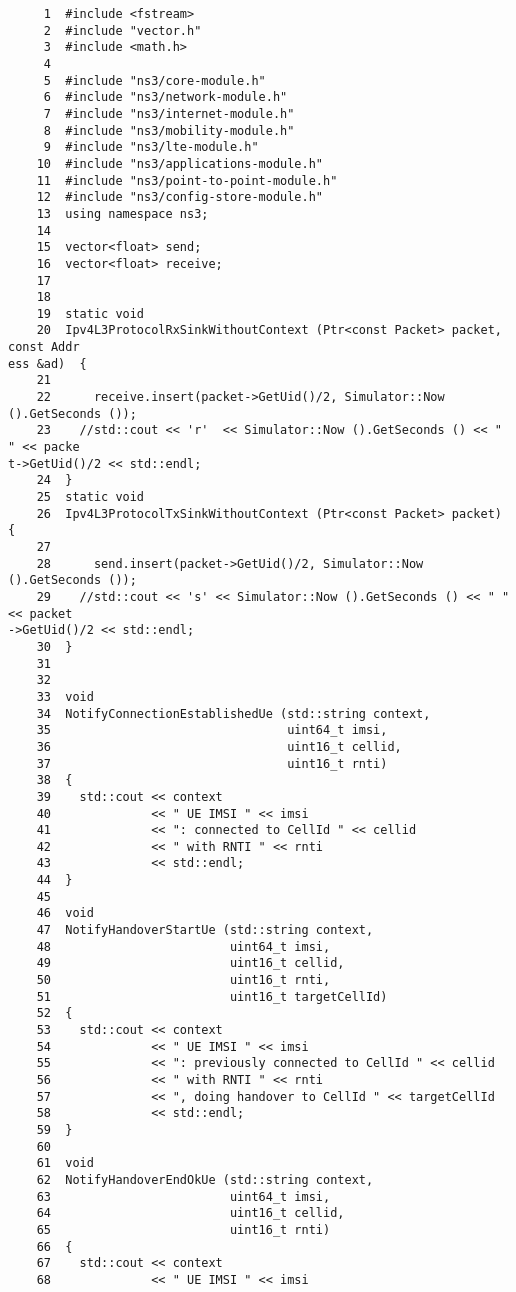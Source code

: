 \fontsize{10pt}{10pt}\selectfont
\begin{verbatim}
     1  #include <fstream>
     2  #include "vector.h"
     3  #include <math.h>
     4
     5  #include "ns3/core-module.h"
     6  #include "ns3/network-module.h"
     7  #include "ns3/internet-module.h"
     8  #include "ns3/mobility-module.h"
     9  #include "ns3/lte-module.h"
    10  #include "ns3/applications-module.h"
    11  #include "ns3/point-to-point-module.h"
    12  #include "ns3/config-store-module.h"
    13  using namespace ns3;
    14
    15  vector<float> send;
    16  vector<float> receive;
    17
    18
    19  static void
    20  Ipv4L3ProtocolRxSinkWithoutContext (Ptr<const Packet> packet, const Addr
ess &ad)  {
    21    
    22      receive.insert(packet->GetUid()/2, Simulator::Now ().GetSeconds ());
    23    //std::cout << 'r'  << Simulator::Now ().GetSeconds () << " " << packe
t->GetUid()/2 << std::endl;
    24  }
    25  static void
    26  Ipv4L3ProtocolTxSinkWithoutContext (Ptr<const Packet> packet)  {
    27    
    28      send.insert(packet->GetUid()/2, Simulator::Now ().GetSeconds ());
    29    //std::cout << 's' << Simulator::Now ().GetSeconds () << " " << packet
->GetUid()/2 << std::endl;
    30  }
    31
    32
    33  void 
    34  NotifyConnectionEstablishedUe (std::string context, 
    35                                 uint64_t imsi, 
    36                                 uint16_t cellid, 
    37                                 uint16_t rnti)
    38  {
    39    std::cout << context 
    40              << " UE IMSI " << imsi 
    41              << ": connected to CellId " << cellid 
    42              << " with RNTI " << rnti 
    43              << std::endl;
    44  }
    45
    46  void 
    47  NotifyHandoverStartUe (std::string context, 
    48                         uint64_t imsi, 
    49                         uint16_t cellid, 
    50                         uint16_t rnti, 
    51                         uint16_t targetCellId)
    52  {
    53    std::cout << context 
    54              << " UE IMSI " << imsi 
    55              << ": previously connected to CellId " << cellid 
    56              << " with RNTI " << rnti 
    57              << ", doing handover to CellId " << targetCellId 
    58              << std::endl;
    59  }
    60
    61  void 
    62  NotifyHandoverEndOkUe (std::string context, 
    63                         uint64_t imsi, 
    64                         uint16_t cellid, 
    65                         uint16_t rnti)
    66  {
    67    std::cout << context 
    68              << " UE IMSI " << imsi 

\end{verbatim}

